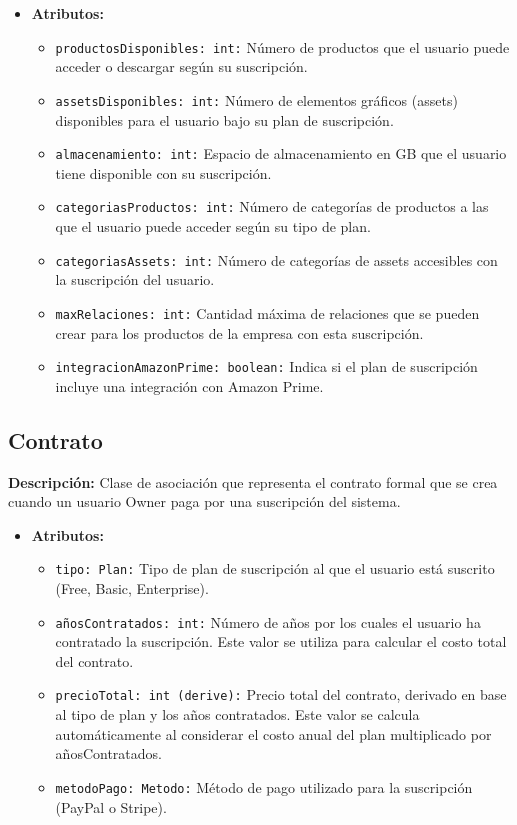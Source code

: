 \documentclass[12pt.a4paper]{article}
\begin{document}
    \begin{itemize}
        \item {\textbf{Atributos:}}
        \begin{itemize}
            \item \texttt{productosDisponibles: int:} Número de productos que el usuario puede acceder o descargar según su suscripción.
            \item \texttt{assetsDisponibles: int:} Número de elementos gráficos (assets) disponibles para el usuario bajo su plan de suscripción.
            \item \texttt{almacenamiento: int:} Espacio de almacenamiento en GB que el usuario tiene disponible con su suscripción.
            \item \texttt{categoriasProductos: int:} Número de categorías de productos a las que el usuario puede acceder según su tipo de plan.
            \item \texttt{categoriasAssets: int:} Número de categorías de assets accesibles con la suscripción del usuario.
            \item \texttt{maxRelaciones: int:} Cantidad máxima de relaciones que se pueden crear para los productos de la empresa con esta suscripción.
            \item \texttt{integracionAmazonPrime: boolean:} Indica si el plan de suscripción incluye una integración con Amazon Prime.
        \end{itemize}
    \end{itemize}

\subsection{Contrato}
\textbf{Descripción:} Clase de asociación que representa el contrato formal que se crea cuando un usuario Owner paga por una suscripción del sistema.
    \begin{itemize}
        \item {\textbf{Atributos:}}
        \begin{itemize}
            \item \texttt{tipo: Plan:} Tipo de plan de suscripción al que el usuario está suscrito (Free, Basic, Enterprise).
             \item \texttt{añosContratados: int:} Número de años por los cuales el usuario ha contratado la suscripción. Este valor se utiliza para calcular el costo total del contrato.
             \item \texttt{precioTotal: int (derive):} Precio total del contrato, derivado en base al tipo de plan y los años contratados. Este valor se calcula automáticamente al considerar el costo anual del plan multiplicado por añosContratados.
             \item \texttt{metodoPago: Metodo:} Método de pago utilizado para la suscripción (PayPal o Stripe).
        \end{itemize}
    \end{itemize}
\end{document}
